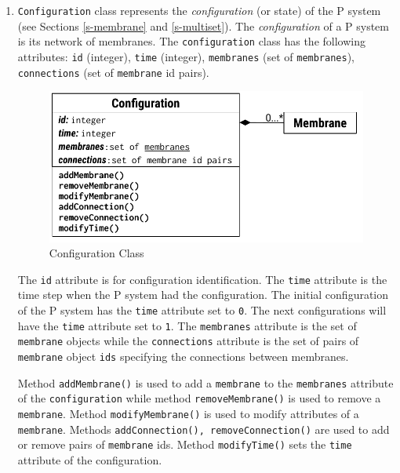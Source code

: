\documentclass{article}
\begin{document}
\begin{enumerate}

\item \texttt{Configuration} class represents the \textit{configuration} (or state) of the P system
(see Sections \ref{s-membrane} and \ref{s-multiset}). The \textit{configuration} of a P system is 
its network of membranes. The \texttt{configuration} class has the following attributes: 
\texttt{id} (integer), \texttt{time} (integer), \texttt{membranes} (set of \texttt{membranes}), 
\texttt{connections} (set of \texttt{membrane} id pairs).

\begin{figure}[H]
\begin{center}
    \includegraphics[scale=0.8]{figures/zzz-configuration.pdf}
    \caption{Configuration Class}
    \label{fig:configuration}
\end{center}
\end{figure}

The \texttt{id} attribute is for configuration identification. The \texttt{time} attribute is the
time step when the P system had the configuration. The initial configuration of the P system has the
\texttt{time} attribute set to \texttt{0}. The next configurations will have the \texttt{time} 
attribute set to \texttt{1}. The \texttt{membranes} attribute is the set of \texttt{membrane} 
objects while the \texttt{connections} attribute is the set of pairs of \texttt{membrane} object 
\texttt{ids} specifying the connections between membranes.  

Method \texttt{addMembrane()} is used to add a \texttt{membrane} to the \texttt{membranes} attribute
of the \texttt{configuration} while method \texttt{removeMembrane()} is used to remove a 
\texttt{membrane}. Method \texttt{modifyMembrane()} is used to modify attributes of a
\texttt{membrane}. Methods \texttt{addConnection(), removeConnection()} are used to add or remove
pairs of \texttt{membrane} ids. Method \texttt{modifyTime()} sets the \texttt{time} attribute of the
configuration.


\end{enumerate}
\end{document}
